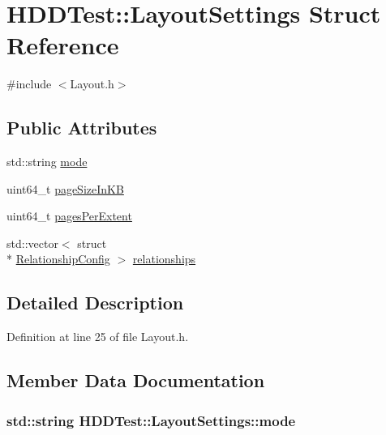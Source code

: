 \hypertarget{struct_h_d_d_test_1_1_layout_settings}{\section{H\-D\-D\-Test\-:\-:Layout\-Settings Struct Reference}
\label{struct_h_d_d_test_1_1_layout_settings}
}


{\ttfamily \#include $<$Layout.\-h$>$}

\subsection*{Public Attributes}
\begin{DoxyCompactItemize}
\item 
std\-::string \hyperlink{struct_h_d_d_test_1_1_layout_settings_ae44172312461b7fa707c3c76dcbf834a}{mode}
\item 
uint64\-\_\-t \hyperlink{struct_h_d_d_test_1_1_layout_settings_ac0a3416abc480fde8b194b02cbfcad25}{page\-Size\-In\-K\-B}
\item 
uint64\-\_\-t \hyperlink{struct_h_d_d_test_1_1_layout_settings_aea0e0ec07c3ddc2dd198345689f6899e}{pages\-Per\-Extent}
\item 
std\-::vector$<$ struct \\*
\hyperlink{struct_h_d_d_test_1_1_relationship_config}{Relationship\-Config} $>$ \hyperlink{struct_h_d_d_test_1_1_layout_settings_a9d2aea674708a168136bd3aba5a27be9}{relationships}
\end{DoxyCompactItemize}


\subsection{Detailed Description}


Definition at line 25 of file Layout.\-h.



\subsection{Member Data Documentation}
\hypertarget{struct_h_d_d_test_1_1_layout_settings_ae44172312461b7fa707c3c76dcbf834a}{
\subsubsection[{mode}]{\setlength{\rightskip}{0pt plus 5cm}std\-::string H\-D\-D\-Test\-::\-Layout\-Settings\-::mode}}\label{struct_h_d_d_test_1_1_layout_settings_ae44172312461b7fa707c3c76dcbf834a}


